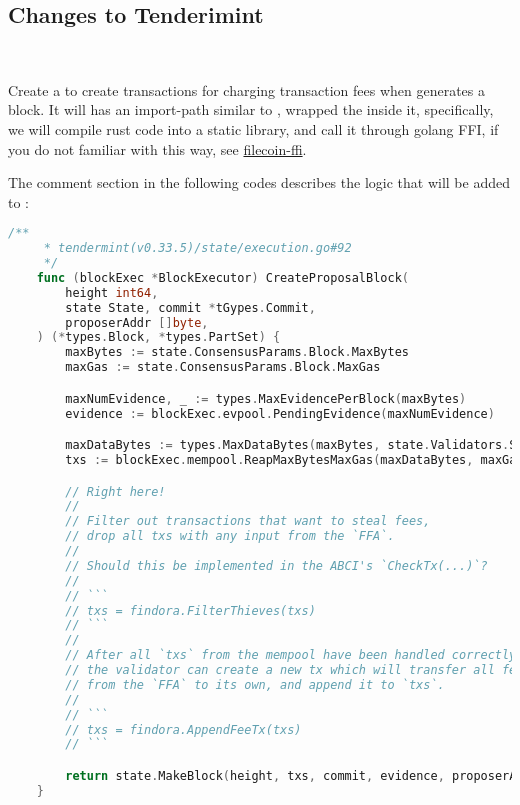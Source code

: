 \clearpage

\subsection{Changes to Tenderimint} \label{tendermint:CreateProposalBlock}

~\par

Create a  to create transactions for charging transaction fees
when  generates a block. It will has an import-path similar to ,
wrapped the  inside it, specifically, we will compile rust code into a static library,
and call it through golang FFI, if you do not familiar with this way,
see \href{https://github.com/filecoin-project/filecoin-ffi}{filecoin-ffi}.

The comment section in the following codes describes the logic
that will be added to :

\begin{lstlisting}[language=go]
    /**
     * tendermint(v0.33.5)/state/execution.go#92
     */
    func (blockExec *BlockExecutor) CreateProposalBlock(
        height int64,
        state State, commit *tGypes.Commit,
        proposerAddr []byte,
    ) (*types.Block, *types.PartSet) {
        maxBytes := state.ConsensusParams.Block.MaxBytes
        maxGas := state.ConsensusParams.Block.MaxGas

        maxNumEvidence, _ := types.MaxEvidencePerBlock(maxBytes)
        evidence := blockExec.evpool.PendingEvidence(maxNumEvidence)

        maxDataBytes := types.MaxDataBytes(maxBytes, state.Validators.Size(), len(evidence))
        txs := blockExec.mempool.ReapMaxBytesMaxGas(maxDataBytes, maxGas)

        // Right here!
        //
        // Filter out transactions that want to steal fees,
        // drop all txs with any input from the `FFA`.
        //
        // Should this be implemented in the ABCI's `CheckTx(...)`?
        //
        // ```
        // txs = findora.FilterThieves(txs)
        // ```
        //
        // After all `txs` from the mempool have been handled correctly,
        // the validator can create a new tx which will transfer all fees
        // from the `FFA` to its own, and append it to `txs`.
        //
        // ```
        // txs = findora.AppendFeeTx(txs)
        // ```

        return state.MakeBlock(height, txs, commit, evidence, proposerAddr)
    }
\end{lstlisting}
